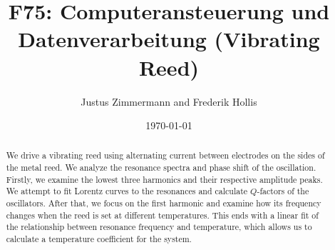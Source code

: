 \documentclass[a4paper]{scrartcl}
\title{F75: Computeransteuerung und Datenverarbeitung (Vibrating Reed)}
\author{Justus Zimmermann and Frederik Hollis}
\date{\today}
\begin{document}
\maketitle

\begin{abstract}
    We drive a vibrating reed using alternating current between electrodes on the sides of the metal reed.
    We analyze the resonance spectra and phase shift of the oscillation.
    Firstly, we examine the lowest three harmonics and their respective amplitude peaks.
    We attempt to fit Lorentz curves to the resonances and calculate $Q$-factors of the oscillators.
    After that, we focus on the first harmonic and examine how its frequency changes when the reed is set at different temperatures.
    This ends with a linear fit of the relationship between resonance frequency and temperature, which allows us to calculate a temperature coefficient for the system.
\end{abstract}

\tableofcontents









\printbibliography
\end{document}

